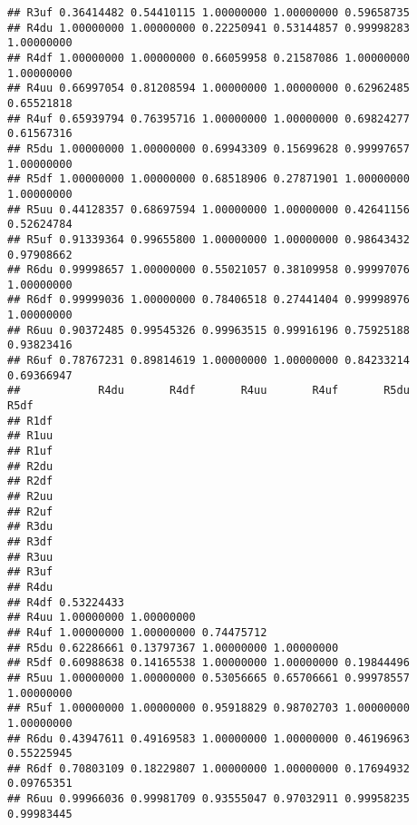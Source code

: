\documentclass[
]{article}
\begin{document}
\begin{verbatim}
## R3uf 0.36414482 0.54410115 1.00000000 1.00000000 0.59658735           
## R4du 1.00000000 1.00000000 0.22250941 0.53144857 0.99998283 1.00000000
## R4df 1.00000000 1.00000000 0.66059958 0.21587086 1.00000000 1.00000000
## R4uu 0.66997054 0.81208594 1.00000000 1.00000000 0.62962485 0.65521818
## R4uf 0.65939794 0.76395716 1.00000000 1.00000000 0.69824277 0.61567316
## R5du 1.00000000 1.00000000 0.69943309 0.15699628 0.99997657 1.00000000
## R5df 1.00000000 1.00000000 0.68518906 0.27871901 1.00000000 1.00000000
## R5uu 0.44128357 0.68697594 1.00000000 1.00000000 0.42641156 0.52624784
## R5uf 0.91339364 0.99655800 1.00000000 1.00000000 0.98643432 0.97908662
## R6du 0.99998657 1.00000000 0.55021057 0.38109958 0.99997076 1.00000000
## R6df 0.99999036 1.00000000 0.78406518 0.27441404 0.99998976 1.00000000
## R6uu 0.90372485 0.99545326 0.99963515 0.99916196 0.75925188 0.93823416
## R6uf 0.78767231 0.89814619 1.00000000 1.00000000 0.84233214 0.69366947
##            R4du       R4df       R4uu       R4uf       R5du       R5df
## R1df                                                                  
## R1uu                                                                  
## R1uf                                                                  
## R2du                                                                  
## R2df                                                                  
## R2uu                                                                  
## R2uf                                                                  
## R3du                                                                  
## R3df                                                                  
## R3uu                                                                  
## R3uf                                                                  
## R4du                                                                  
## R4df 0.53224433                                                       
## R4uu 1.00000000 1.00000000                                            
## R4uf 1.00000000 1.00000000 0.74475712                                 
## R5du 0.62286661 0.13797367 1.00000000 1.00000000                      
## R5df 0.60988638 0.14165538 1.00000000 1.00000000 0.19844496           
## R5uu 1.00000000 1.00000000 0.53056665 0.65706661 0.99978557 1.00000000
## R5uf 1.00000000 1.00000000 0.95918829 0.98702703 1.00000000 1.00000000
## R6du 0.43947611 0.49169583 1.00000000 1.00000000 0.46196963 0.55225945
## R6df 0.70803109 0.18229807 1.00000000 1.00000000 0.17694932 0.09765351
## R6uu 0.99966036 0.99981709 0.93555047 0.97032911 0.99958235 0.99983445

\end{verbatim}
\end{document}
